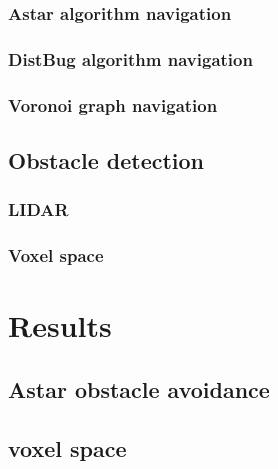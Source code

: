 \documentclass[a4paper, 12pt, titlepage]{article}
\begin{document}
        \subsubsection{Astar algorithm navigation}
        \subsubsection{DistBug algorithm navigation}
        \subsubsection{Voronoi graph navigation}
    \subsection{Obstacle detection}
        \subsubsection{LIDAR}
        \subsubsection{Voxel space}

\section{Results}
    \subsection{Astar obstacle avoidance}
    \subsection{voxel space}
        
        
\end{document}
